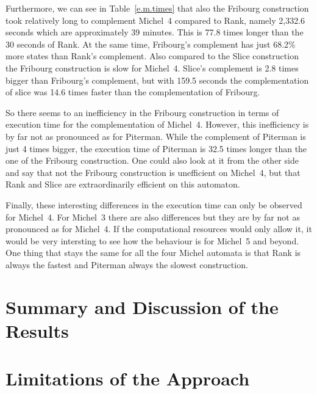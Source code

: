 Furthermore, we can see in Table~\ref{e.m.times} that also the Fribourg construction took relatively long to complement Michel~4 compared to Rank, namely 2,332.6 seconds which are approximately 39 minutes. This is 77.8 times longer than the 30 seconds of Rank. At the same time, Fribourg's complement has just 68.2\% more states than Rank's complement. Also compared to the Slice construction the Fribourg construction is slow for Michel~4. Slice's complement is 2.8 times bigger than Fribourg's complement, but with 159.5 seconds the complementation of slice was 14.6 times faster than the complementation of Fribourg.

So there seems to an inefficiency in the Fribourg construction in terms of execution time for the complementation of Michel~4. However, this inefficiency is by far not as pronounced as for Piterman. While the complement of Piterman is just 4 times bigger, the execution time of Piterman is 32.5 times longer than the one of the Fribourg construction. One could also look at it from the other side and say that not the Fribourg construction is unefficient on Michel~4, but that Rank and Slice are extraordinarily efficient on this automaton.

Finally, these interesting differences in the execution time can only be observed for Michel~4. For Michel~3 there are also differences but they are by far not as pronounced as for Michel~4. If the computational resources would only allow it, it would be very intersting to see how the behaviour is for Michel~5 and beyond. One thing that stays the same for all the four Michel automata is that Rank is always the fastest and Piterman always the slowest construction.


\section{Summary and Discussion of the Results}

\section{Limitations of the Approach}
